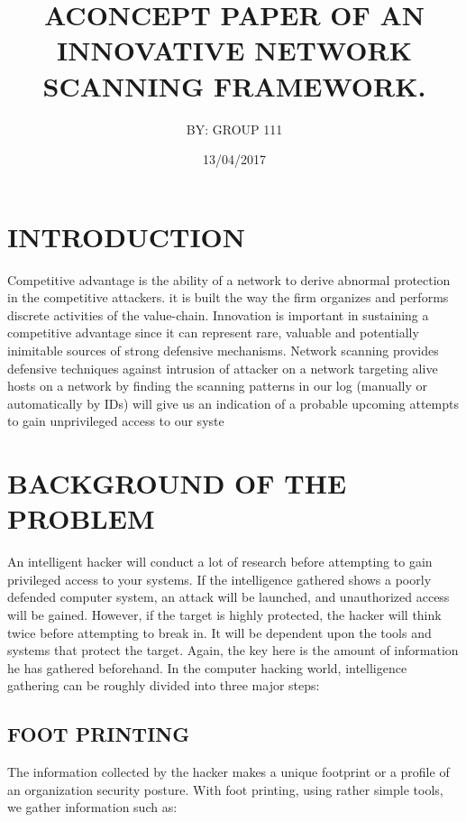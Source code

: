 \documentclass{article}
\begin{document}
\title{ ACONCEPT PAPER OF AN  INNOVATIVE NETWORK SCANNING FRAMEWORK.}

\author{ BY: GROUP 111}
\date {13/04/2017}

\maketitle

\tableofcontents

\section{INTRODUCTION}\label{sec:into}
Competitive advantage is the ability of a network to derive abnormal protection in the competitive attackers. it is built the way the firm organizes and performs discrete activities of the value-chain. Innovation   is important in sustaining a competitive  advantage since it can represent rare, valuable and potentially inimitable sources of  strong defensive mechanisms.
Network scanning provides   defensive techniques against intrusion of attacker on a network  targeting alive hosts on a network  by finding the scanning patterns in our log (manually or automatically by IDs) will give us an indication of a probable upcoming attempts to gain unprivileged access to our syste

\section{BACKGROUND OF THE PROBLEM}\label{sec:into}
An intelligent hacker will conduct a lot of research before attempting to gain privileged access
to your systems.
If the intelligence gathered shows a poorly defended computer system, an attack will be
launched, and unauthorized access will be gained.
However, if the target is highly protected, the hacker will think twice before attempting to
break in. It will be dependent upon the tools and systems that protect the target.
Again, the key here is the amount of information he has gathered beforehand.
In the computer hacking world, intelligence gathering can be roughly divided into three major
steps:

\subsection{FOOT PRINTING}\label{sec:into}
The information collected by the hacker makes a unique footprint or a profile
of an organization security posture.
With foot printing, using rather simple tools, we gather information such as:
 
\end{document}
